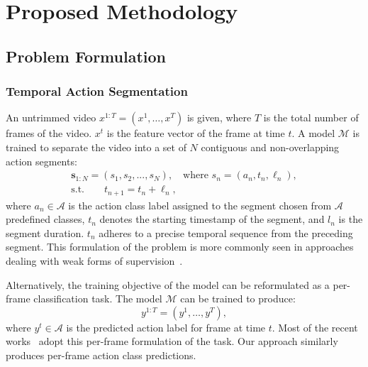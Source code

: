\chapter{Proposed Methodology}
\label{ch:meth}

\section{Problem Formulation}

\subsection{Temporal Action Segmentation}

An untrimmed video $x^{1:T} = ( x^1, \ldots, x^T )$ is given, where $T$ is the total number of frames of the video. $x^t$ is the feature vector of the frame at time $t$. A model $\mathcal{M}$ is trained to separate the video into a set of $N$ contiguous and non-overlapping action segments:
\begin{gather}\label{eq:segment}
    \mathbf{s}_{1:N} = (s_1,s_2,...,s_N), \quad \text{where }   
    s_n = (a_n, t_n, \ell_n), \\
    \text{s.t.} \qquad t_{n+1} = t_n+\ell_n, \nonumber
\end{gather}
where $a_n \in \mathcal{A}$ is the action class label assigned to the segment chosen from $\mathcal{A}$ predefined classes, $t_n$ denotes the starting timestamp of the segment, and $l_n$ is the segment duration. $t_n$ adheres to a precise temporal sequence from the preceding segment. This formulation of the problem is more commonly seen in approaches dealing with weak forms of supervision~\cite{richard2018nnviterbi,richard2018actionset,li2019weak}.

Alternatively, the training objective of the model can be reformulated as a per-frame classification task. The model $\mathcal{M}$ can be trained to produce:
\begin{equation}
    y^{1:T} = ( y^1, \ldots, y^T ),
\end{equation}
where $y^t \in \mathcal{A}$ is the predicted action label for frame at time $t$. Most of the recent works~\cite{yi2021asformer,ding2022leveraging,singhania2023c2f,liu2023diffact,li2023ms++} adopt this per-frame formulation of the task. Our approach similarly produces per-frame action class predictions.

